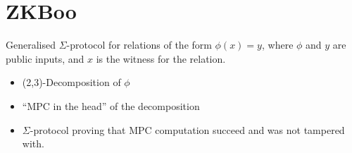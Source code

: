 \chapter{ZKBoo}
\label{ch:zkboo}

Generalised $\Sigma$-protocol for relations of the form $\phi(x) = y$, where
$\phi$ and $y$ are public inputs, and $x$ is the witness for the relation.

\begin{itemize}
  \item (2,3)-Decomposition of $\phi$
  \item ``MPC in the head'' of the decomposition
  \item $\Sigma$-protocol proving that MPC computation succeed and was not
    tampered with.
\end{itemize}


